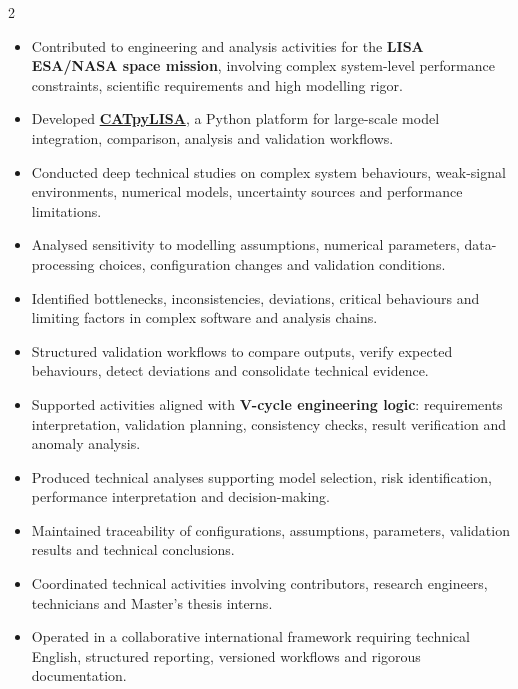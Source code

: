 \documentclass[8pt,a4paper,ragged2e,withhyper]{altacv}
\begin{document}
\begin{paracol}{2}

\begin{itemize}
\item Contributed to engineering and analysis activities for the \textbf{LISA ESA/NASA space mission}, involving complex system-level performance constraints, scientific requirements and high modelling rigor.
\item Developed \textcolor{DarkPastelRed}{\href{https://gitlab.oca.eu/gboileau/lisa_l3_tools}{\bf CATpyLISA}}, a Python platform for large-scale model integration, comparison, analysis and validation workflows.
\item Conducted deep technical studies on complex system behaviours, weak-signal environments, numerical models, uncertainty sources and performance limitations.
\item Analysed sensitivity to modelling assumptions, numerical parameters, data-processing choices, configuration changes and validation conditions.
\item Identified bottlenecks, inconsistencies, deviations, critical behaviours and limiting factors in complex software and analysis chains.
\item Structured validation workflows to compare outputs, verify expected behaviours, detect deviations and consolidate technical evidence.
\item Supported activities aligned with \textbf{V-cycle engineering logic}: requirements interpretation, validation planning, consistency checks, result verification and anomaly analysis.
\item Produced technical analyses supporting model selection, risk identification, performance interpretation and decision-making.
\item Maintained traceability of configurations, assumptions, parameters, validation results and technical conclusions.
\item Coordinated technical activities involving contributors, research engineers, technicians and Master's thesis interns.
\item Operated in a collaborative international framework requiring technical English, structured reporting, versioned workflows and rigorous documentation.
\end{itemize}

\divider


\end{paracol}
\end{document}
